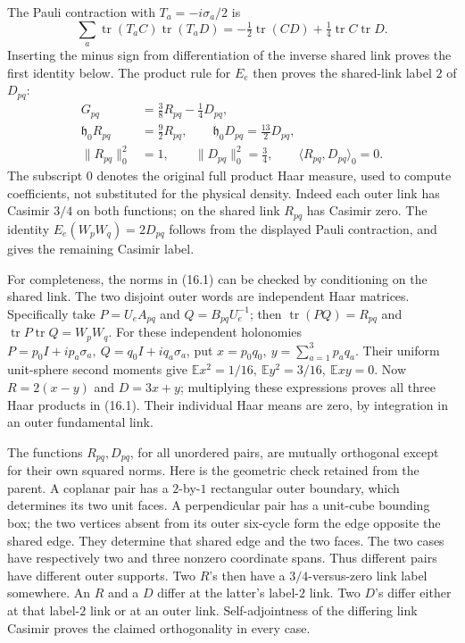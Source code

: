 \documentclass[
]{article}
\begin{document}
The Pauli contraction with \(T_a=-i\sigma_a/2\) is \[
\sum_a\operatorname{tr}(T_aC)\operatorname{tr}(T_aD)
 =-\tfrac12\operatorname{tr}(CD)
   +\tfrac14\operatorname{tr}C\operatorname{tr}D .
\] Inserting the minus sign from differentiation of the inverse shared
link proves the first identity below. The product rule for \(E_e\) then
proves the shared-link label \(2\) of \(D_{pq}\): \[
\begin{split}
G_{pq}&=\tfrac38R_{pq}-\tfrac14D_{pq},\\
\mathfrak h_0R_{pq}&=\tfrac92R_{pq},\qquad
\mathfrak h_0D_{pq}=\tfrac{13}{2}D_{pq},\\
\|R_{pq}\|_0^2&=1,\qquad
\|D_{pq}\|_0^2=\tfrac34,\qquad
\langle R_{pq},D_{pq}\rangle_0=0 .
\end{split}                                                  \tag{16.1}
\] The subscript \(0\) denotes the original full product Haar measure,
used to compute coefficients, not substituted for the physical density.
Indeed each outer link has Casimir \(3/4\) on both functions; on the
shared link \(R_{pq}\) has Casimir zero. The identity
\(E_e(W_pW_q)=2D_{pq}\) follows from the displayed Pauli contraction,
and gives the remaining Casimir label.

For completeness, the norms in (16.1) can be checked by conditioning on
the shared link. The two disjoint outer words are independent Haar
matrices. Specifically take \(P=U_eA_{pq}\) and \(Q=B_{pq}U_e^{-1}\);
then \(\operatorname{tr}(PQ)=R_{pq}\) and
\(\operatorname{tr}P\operatorname{tr}Q=W_pW_q\). For these independent
holonomies \(P=p_0I+i p_a\sigma_a,\ Q=q_0I+i q_a\sigma_a\), put
\(x=p_0q_0,\ y=\sum_{a=1}^3p_aq_a\). Their uniform unit-sphere second
moments give
\(\mathbb E x^2=1/16,\ \mathbb E y^2=3/16,\ \mathbb E xy=0\). Now
\(R=2(x-y)\) and \(D=3x+y\); multiplying these expressions proves all
three Haar products in (16.1). Their individual Haar means are zero, by
integration in an outer fundamental link.

The functions \(R_{pq},D_{pq}\), for all unordered pairs, are mutually
orthogonal except for their own squared norms. Here is the geometric
check retained from the parent. A coplanar pair has a \(2\)-by-\(1\)
rectangular outer boundary, which determines its two unit faces. A
perpendicular pair has a unit-cube bounding box; the two vertices absent
from its outer six-cycle form the edge opposite the shared edge. They
determine that shared edge and the two faces. The two cases have
respectively two and three nonzero coordinate spans. Thus different
pairs have different outer supports. Two \(R\)'s then have a
\(3/4\)-versus-zero link label somewhere. An \(R\) and a \(D\) differ at
the latter's label-\(2\) link. Two \(D\)'s differ either at that
label-\(2\) link or at an outer link. Self-adjointness of the differing
link Casimir proves the claimed orthogonality in every case.
\end{document}
